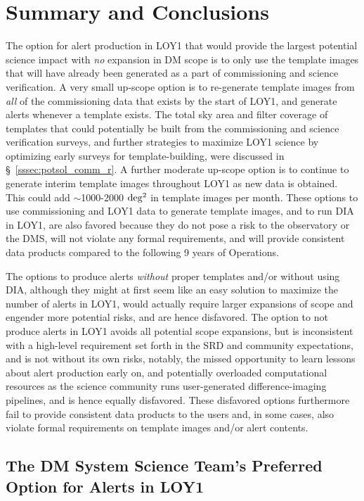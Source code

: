 \documentclass[DM,toc]{lsstdoc}
\begin{document}
\clearpage
\section{Summary and Conclusions}\label{sec:rec}

The option for alert production in LOY1 that would provide the largest potential science impact with {\em no} expansion in DM scope is to only use the template images that will have already been generated as a part of commissioning and science verification.
A very small up-scope option is to re-generate template images from {\em all} of the commissioning data that exists by the start of LOY1, and generate alerts whenever a template exists.
The total sky area and filter coverage of templates that could potentially be built from the commissioning and science verification surveys, and further strategies to maximize LOY1 science by optimizing early surveys for template-building, were discussed in \S~\ref{sssec:potsol_comm_r}.
A further moderate up-scope option is to continue to generate interim template images throughout LOY1 as new data is obtained.
This could add $\sim$1000-2000 $\rm deg^2$ in template images per month.
These options to use commissioning and LOY1 data to generate template images, and to run DIA in LOY1, are also favored because they do not pose a risk to the observatory or the DMS, will not violate any formal requirements, and will provide consistent data products compared to the following 9 years of Operations.

The options to produce alerts {\it without} proper templates and/or without using DIA, although they might at first seem like an easy solution to maximize the number of alerts in LOY1, would actually require larger expansions of scope and engender more potential risks, and are hence disfavored.
The  option to not produce alerts in LOY1 avoids all potential scope expansions, but is inconsistent with a high-level requirement set forth in the SRD and community expectations, and is not without its own risks, notably,  the missed opportunity to learn lessons about alert production early on, and potentially overloaded computational resources as the science community runs user-generated difference-imaging pipelines, and is hence equally disfavored.
These disfavored options furthermore fail to provide consistent data products to the users and, in some cases, also violate formal requirements on template images and/or alert contents.

\subsection{The DM System Science Team's Preferred Option for Alerts in LOY1}
\end{document}
